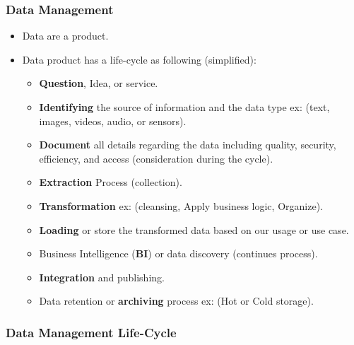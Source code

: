\begin{frame}
\frametitle{Data Management}

\begin{itemize}
	\item Data are a product.
	\item Data product has a life-cycle as following (simplified): 
	\begin{itemize}
		\item \textbf{Question}, Idea, or service.
		\item \textbf{Identifying} the source of information and the data type ex: (text, images, videos, audio, or sensors).
		\item \textbf{Document} all details regarding the data including quality, security, efficiency, and access (consideration during the cycle).
		\item \textbf{Extraction} Process (collection).
		\item \textbf{Transformation} ex: (cleansing, Apply business logic, Organize).
		\item \textbf{Loading} or store the transformed data based on our usage or use case.
		\item Business Intelligence (\textbf{BI}) or data discovery (continues process).
		\item \textbf{Integration} and publishing.
		\item Data retention or \textbf{archiving} process ex: (Hot or Cold storage).
	\end{itemize}
\end{itemize}

\end{frame}


\begin{frame}
\frametitle{Data Management Life-Cycle}
\begin{center}			


\end{center}

\end{frame}

